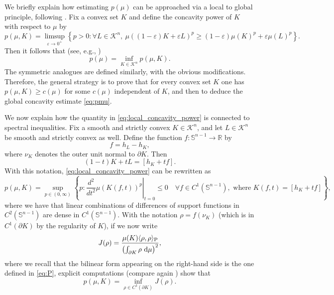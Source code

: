 \documentclass[a4paper, 11pt]{article}
\newcommand{\sph}{\mathbb{S}}
\newcommand{\K}{\mathcal{K}}
\theoremstyle{definition}
\newcommand{\di}{\, \mathrm{d}}
\begin{document}
We briefly explain how estimating  $p(\mu)$ can be approached via a local to global principle, following \cite{Kol_Liv_Gardner-Zvavitch,GalynaStability}. Fix a convex set $K$ and define the concavity power of $K$ with respect to $\mu$ by
\begin{equation}\label{eq:local_concavity_power}
p(\mu,K)= \limsup_{\varepsilon \rightarrow 0^{+}} \left\{p>0 : \forall L \in \mathcal{K}^{n},\ \mu((1-\varepsilon)K+\varepsilon L)^{p} \geq (1-\varepsilon)\mu(K)^{p}+\varepsilon\mu(L)^{p}\right\}. 
\end{equation}
Then it follows that (see, e.g., \cite{GalynaStability})
\[p(\mu) = \inf_{K \in \K^n} p(\mu,K).\]
The symmetric analogues are defined similarly, with the obvious modifications. Therefore, the general strategy is to prove that for every convex set $K$ one has $p(\mu,K) \geq c(\mu)$ for some $c(\mu)$ independent of $K$, and then to deduce the global concavity estimate \eqref{eq:pmu}.

\medskip

We now explain how the quantity in \eqref{eq:local_concavity_power} is connected to spectral inequalities. Fix a smooth and strictly convex $K\in\mathcal{K}^n$, and let $L\in\mathcal{K}^n$ be smooth and strictly convex as well. Define the function $f : \sph^{n-1} \to \mathbb{R}$ by
\begin{equation}\label{eq:addmisible_pertubations}
f = h_{L}-h_{K},
\end{equation}
where $\nu_K$ denotes the outer unit normal to $\partial K$. Then
\[(1-t)K + t L = [h_{K}+tf].\]
With this notation, \eqref{eq:local_concavity_power} can be rewritten as
\[p(\mu,K)= \sup_{p \in (0,\infty)} \left\{ p : \left.\frac{d^{2}}{dt^{2}}\mu(K(f,t))^{p}\right|_{t=0} \leq 0\quad \forall f \in C^{1}(\sph^{n-1}), \text{ where } K(f,t)=[h_K+tf] \right\},\] where we have that linear combinations of differences of support functions in $C^2(\sph^{n-1})$ are dense in $C^1(\sph^{n-1})$. With the notation $\rho=f(\nu_K)$ (which is in $C
^1(\partial K)$ by the regularity of $K$), if we now write \[J(\rho) = \frac{\mu(K)\langle \rho,\rho\rangle_{\rm P}}{\left(\int_{\partial K}\rho\,\di\mu\right)^2},\] where we recall that the bilinear form appearing on the right-hand side is the one defined in \eqref{eq:P}, explicit computations (compare again \cite{GalynaStability}) show that 
\begin{equation}\label{eq:def_concavity_power}
p(\mu,K)= \inf_{\rho \in C^{1}(\partial K)} J(\rho).
\end{equation}
\end{document}
